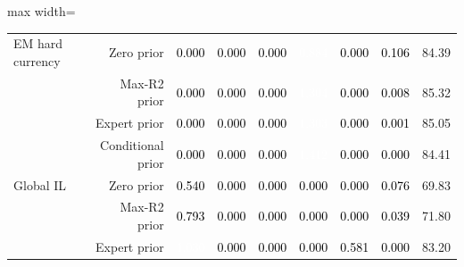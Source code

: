 \documentclass[a4paper,review]{cas-sc}
\begin{document}
\begin{table}[pos=htbp]
\begin{adjustbox}{max width=\linewidth}
\begin{tabular}{lrrrrrrrr}
EM hard currency & Zero prior & \cellcolor[HTML]{FFFFFF}\textcolor{black}{0.000} & \cellcolor[HTML]{FFFFFF}\textcolor{black}{0.000} & \cellcolor[HTML]{FFFFFF}\textcolor{black}{0.000} & \cellcolor[HTML]{D7634F}\textcolor{white}{0.884} & \cellcolor[HTML]{FFFFFF}\textcolor{black}{0.000} & \cellcolor[HTML]{F9EDE5}\textcolor{black}{0.106} & 84.39 \\
 & Max-R2 prior & \cellcolor[HTML]{FFFFFF}\textcolor{black}{0.000} & \cellcolor[HTML]{FFFFFF}\textcolor{black}{0.000} & \cellcolor[HTML]{FFFFFF}\textcolor{black}{0.000} & \cellcolor[HTML]{960F27}\textcolor{white}{1.304} & \cellcolor[HTML]{FFFFFF}\textcolor{black}{0.000} & \cellcolor[HTML]{F7F6F6}\textcolor{black}{0.008} & 85.32 \\
 & Expert prior & \cellcolor[HTML]{FFFFFF}\textcolor{black}{0.000} & \cellcolor[HTML]{FFFFFF}\textcolor{black}{0.000} & \cellcolor[HTML]{FFFFFF}\textcolor{black}{0.000} & \cellcolor[HTML]{960F27}\textcolor{white}{1.303} & \cellcolor[HTML]{FFFFFF}\textcolor{black}{0.000} & \cellcolor[HTML]{F7F6F6}\textcolor{black}{0.001} & 85.05 \\
 & Conditional prior & \cellcolor[HTML]{FFFFFF}\textcolor{black}{0.000} & \cellcolor[HTML]{FFFFFF}\textcolor{black}{0.000} & \cellcolor[HTML]{FFFFFF}\textcolor{black}{0.000} & \cellcolor[HTML]{7C0722}\textcolor{white}{1.412} & \cellcolor[HTML]{FFFFFF}\textcolor{black}{0.000} & \cellcolor[HTML]{FFFFFF}\textcolor{black}{0.000} & 84.41 \\
Global IL & Zero prior & \cellcolor[HTML]{F6AF8E}\textcolor{black}{0.540} & \cellcolor[HTML]{FFFFFF}\textcolor{black}{0.000} & \cellcolor[HTML]{FFFFFF}\textcolor{black}{0.000} & \cellcolor[HTML]{FFFFFF}\textcolor{black}{0.000} & \cellcolor[HTML]{FFFFFF}\textcolor{black}{0.000} & \cellcolor[HTML]{F9F0EB}\textcolor{black}{0.076} & 69.83 \\
 & Max-R2 prior & \cellcolor[HTML]{E17860}\textcolor{black}{0.793} & \cellcolor[HTML]{FFFFFF}\textcolor{black}{0.000} & \cellcolor[HTML]{FFFFFF}\textcolor{black}{0.000} & \cellcolor[HTML]{FFFFFF}\textcolor{black}{0.000} & \cellcolor[HTML]{FFFFFF}\textcolor{black}{0.000} & \cellcolor[HTML]{F8F3F0}\textcolor{black}{0.039} & 71.80 \\
 & Expert prior & \cellcolor[HTML]{C6413E}\textcolor{white}{1.030} & \cellcolor[HTML]{FFFFFF}\textcolor{black}{0.000} & \cellcolor[HTML]{FFFFFF}\textcolor{black}{0.000} & \cellcolor[HTML]{FFFFFF}\textcolor{black}{0.000} & \cellcolor[HTML]{F5A886}\textcolor{black}{0.581} & \cellcolor[HTML]{FFFFFF}\textcolor{black}{0.000} & 83.20 \\

\end{tabular}
\end{adjustbox}
\end{table}
\end{document}
